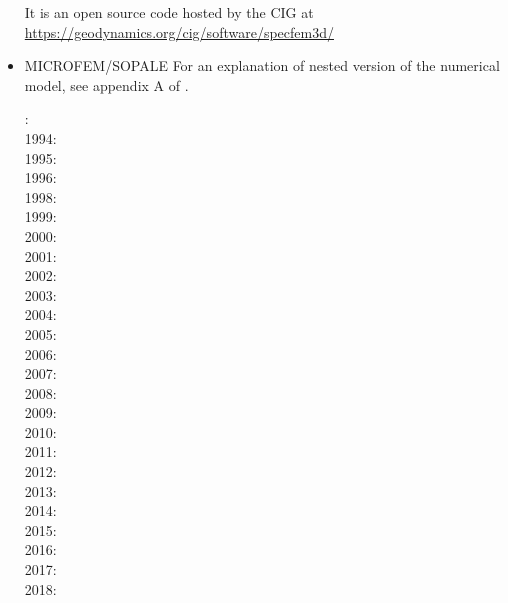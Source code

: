 \begin{itemize}
It is an open source code hosted by the CIG at 
\url{https://geodynamics.org/cig/software/specfem3d/}

{\small
\noindent
\cite{kott05}
}

\item {\codefont MICROFEM}/{\codefont SOPALE} 
For an explanation of nested version of the numerical model, see appendix A of \cite{webe18}.

{\small
{}: \cite{wibf93}\\
1994: \cite{wibe94}\cite{befh94}\cite{bequ94}\\
1995: \cite{full95}\cite{elfb95}\\
1996: \cite{bekh96}\cite{beeh96}\cite{wabe96}\\
1998: \cite{elbj98}\cite{jabf98}\cite{wabb98}\\
1999: \cite{will99a}\cite{will99b}\cite{elbp99}\cite{elbe99}\cite{beep99}\cite{pelj99}\\
2000: \cite{pybf00}\cite{bemh00}\cite{pfeb00}\\
2001: \cite{bejn01}\\
2002: \cite{hube02}\cite{pybf02}\\
2003: \cite{hube03}\cite{vamf03}\cite{wipo03}\cite{pymi03}\cite{bupf03}\cite{wiep03}\\
2004: \cite{bejn04}\cite{pycr04}\cite{pybe04}\cite{elsp04}\cite{geim04}\cite{jabm04}\\
2005: \cite{gebi05}\cite{hubb05}\\
2006: \cite{pysk06}\cite{selz06}\cite{pabs06}\cite{jabn06}\cite{benj06}\cite{cubj06}\cite{crnp06}\\
2007: \cite{hube07}\cite{cubh07}\cite{mohb07}\cite{sebp07}\cite{buto07b}\cite{jabn07}\cite{shpy07}\\
2008: \cite{sebp08}\cite{wabj08}\cite{wabj08b}\cite{gopy08}\cite{buhb08}\cite{hube08}\cite{cuhb08}\\
2009: \cite{kecw09}\cite{bejb09}\cite{bupb09}\cite{grba09}\cite{sihb09}\\
2010: \cite{albs10}\cite{albe10}\cite{grpy10}\cite{pygp10}\cite{albi10}\cite{jabw10}\cite{inbe10}
      \cite{inbe10b}\\
2011: \cite{cube11}\cite{bubj11}\cite{hube11}\cite{jabe11}\\
2012: \cite{grpy12}\cite{grpy12b}\cite{kogp12}\cite{grbe12}\cite{jahu12}\cite{albe12}\cite{grbi12}
      \cite{goib12}\cite{bein12}\\
2013: \cite{bubj13}\cite{chbe13}\cite{fihv13a}\cite{fihv13b}\cite{gobi13}\cite{grpy13}
      \cite{knak13}\cite{nipc13}\cite{krcu13}\\
2014: \cite{gogu14}\cite{jahm14}\cite{hube14}\cite{bubj14}\\
2015: \cite{albe15}\cite{bubj15}\cite{heps15}\cite{cudd15}\\
2016: \cite{licu16}\cite{albe16}\cite{kebb16}\\
2017: \cite{bube17}\cite{grbe17}\\
2018: \cite{webe18}\cite{webe18b}
}


\end{itemize}
